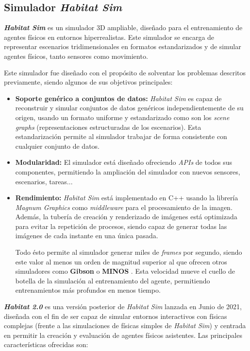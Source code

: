 \subsection{Simulador \textit{Habitat Sim}}

\textbf{\textit{Habitat Sim}} \cite{habitat19iccv} es un simulador 3D ampliable, diseñado para el entrenamiento de agentes físicos en entornos hiperrealistas. Este simulador se encarga de representar escenarios tridimensionales en formatos estandarizados y de simular agentes físicos, tanto sensores como movimiento. 

Este simulador fue diseñado con el propósito de solventar los problemas descritos previamente, siendo algunos de sus objetivos principales:

\begin{itemize}
	\item \textbf{Soporte genérico a conjuntos de datos:} \textit{Habitat Sim} es capaz de reconstruir y simular conjuntos de datos genéricos independientemente de su origen, usando un formato uniforme y estandarizado como son los \textit{scene graphs} \cite{DBLP:journals/corr/abs-2104-01111} (representaciones estructuradas de los escenarios). Esta estandarización permite al simulador trabajar de forma consistente con cualquier conjunto de datos.
	\item \textbf{Modularidad:} El simulador está diseñado ofreciendo \textit{APIs} de todos sus componentes, permitiendo la ampliación del simulador con nuevos sensores, escenarios, tareas...
	\item \textbf{Rendimiento:} \textit{Habitat Sim} está implementado en C++ usando la librería \textit{Magnum Graphics} como \textit{middleware} para el procesamiento de la imagen. Además, la tubería de creación y renderizado de imágenes está optimizada para evitar la repetición de procesos, siendo capaz de generar todas las imágenes de cada instante en una única pasada.
	
	Todo ésto permite al simulador generar miles de \textit{frames} por segundo, siendo este valor al menos un orden de magnitud superior al que ofrecen otros simuladores como \textbf{Gibson} \cite{xiazamirhe2018gibsonenv} o \textbf{MINOS} \cite{DBLP:journals/corr/abs-1712-03931}. Esta velocidad mueve el cuello de botella de la simulación al entrenamiento del agente, permitiendo entrenamientos más profundos en menos tiempo.
\end{itemize}

\textbf{\textit{Habitat 2.0}} \cite{szot2021habitat} es una versión posterior de \textit{Habitat Sim} lanzada en Junio de 2021, diseñada con el fin de ser capaz de simular entornos interactivos con físicas complejas (frente a las simulaciones de físicas simples de \textit{Habitat Sim}) y centrada en permitir la creación y evaluación de agentes físicos asistentes. Las principales características ofrecidas son:

